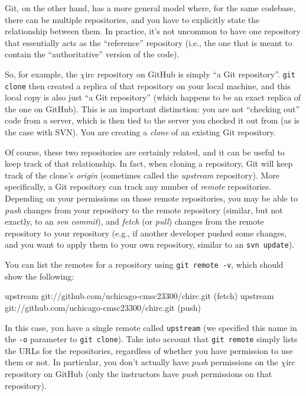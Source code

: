 \documentclass[10pt]{article}
\newcommand{\chirc}{$\chi$\textsf{irc} }
\newenvironment{example}%
{\VerbatimEnvironment\begin{Sbox}\begin{VerbExample}}%
{\end{VerbExample}\end{Sbox}\setlength{\fboxsep}{8pt}\begin{center}\fcolorbox{black}{backgroundgray}{\TheSbox}\end{center}}
\begin{document}
Git, on the other hand, has a more general model where, for the same codebase,  there can be multiple repositories, and you have to explicitly state the relationship between them. In practice, it's not uncommon to have one repository that essentially acts as the ``reference'' repository (i.e., the one that is meant to contain the ``authoritative'' version of the code).

So, for example, the \chirc repository on GitHub is simply ``a Git repository''. \texttt{git clone} then created a replica of that repository on your local machine, and this local copy is also just ``a Git repository'' (which happens to be an exact replica of the one on GitHub). This is an important distinction: you are not ``checking out'' code from a server, which is then tied to the server you checked it out from (as is the case with SVN). You are creating a \emph{clone} of an existing Git repository.

Of course, these two repositories are certainly related, and it can be useful to keep track of that relationship. In fact, when cloning a repository, Git will keep track of the clone's \emph{origin} (sometimes called the \emph{upstream} repository). More specifically, a Git repository can track any number of \emph{remote} repositories. Depending on your permissions on those remote repositories, you may be able to \emph{push} changes from your repository to the remote repository (similar, but not exactly, to an \emph{svn commit}), and \emph{fetch} (or \emph{pull}) changes from the remote repository to your repository (e.g., if another developer pushed some changes, and you want to apply them to your own repository, similar to an \texttt{svn update}). 

You can list the remotes for a repository using \texttt{git remote -v}, which should show the following:

\begin{example}
upstream	git://github.com/uchicago-cmsc23300/chirc.git (fetch)
upstream	git://github.com/uchicago-cmsc23300/chirc.git (push)
\end{example}

In this case, you have a single remote called \texttt{upstream} (we specified this name in the \texttt{-o} parameter to \texttt{git clone}). Take into account that \texttt{git remote} simply lists the URLs for the repositories, regardless of whether you have permission to use them or not. In particular, you don't actually have \emph{push} permissions on the \chirc repository on GitHub (only the instructors have \emph{push} permissions on that repository).  
\end{document}
